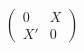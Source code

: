 \documentclass{article}
\begin{document}
\[ \begin{pmatrix} 0 & X \\ X' & 0 \end{pmatrix} \]
\pagebreak
\end{document}
